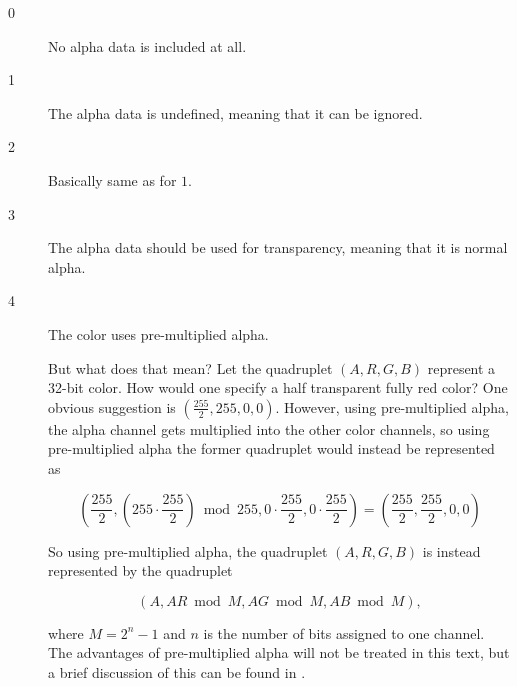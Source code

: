 \begin{description}
  \item[0] No alpha data is included at all.
  \item[1] The alpha data is undefined, meaning that it can be ignored.
  \item[2] Basically same as for $1$.
  \item[3] The alpha data should be used for transparency, meaning
    that it is normal alpha.
  \item[4] The color uses pre-multiplied alpha.

    But what does that mean? Let the quadruplet $(A,R,G,B)$ represent
    a 32-bit \argb color. How would one specify a half transparent
    fully red color? One obvious suggestion is
    $\left(\frac{255}{2},255,0,0\right)$. However, using
    pre-multiplied alpha, the alpha channel gets multiplied into the
    other color channels, so using pre-multiplied alpha the former
    quadruplet would instead be represented as

    \begin{equation*}
    \left(
    \frac{255}{2},
    \left(255 \cdot \frac{255}{2}\right) \bmod 255,
    0 \cdot \frac{255}{2},
    0 \cdot \frac{255}{2}\right)  =  \left(\frac{255}{2},\frac{255}{2}, 0, 0\right)
    \end{equation*}

    So using pre-multiplied alpha, the quadruplet $(A,R,G,B)$ is
    instead represented by the quadruplet

    \begin{equation*}
     \left(A, AR \bmod M, AG \bmod M, AB \bmod M \right),
    \end{equation*}

    where $M=2^n - 1$ and $n$ is the number of bits assigned to one
    channel. The advantages of pre-multiplied alpha will not be
    treated in this text, but a brief discussion of this can be found
    in \cite{porter84_compos_dig_img}.

\end{description}